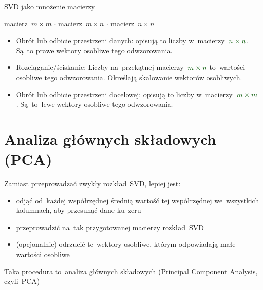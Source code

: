 \documentclass{beamer}
\begin{document}
  \begin{frame}{SVD jako mnożenie macierzy}

    {\g macierz~$m \times m$
    $\cdot$ macierz~$m \times n$
      $\cdot$ macierz~$n \times n$}

    \begin{itemize}
      \item Obrót lub odbicie przestrzeni danych: opisują to liczby
        w~macierzy~$\g n \times n$. Są~to {\g prawe wektory osobliwe}
        tego odwzorowania.
      \item Rozciąganie/ściskanie: Liczby na~przekątnej macierzy~$\g m
        \times n$ to~{\g wartości osobliwe} tego odwzorowania.
        Określają skalowanie wektorów osobliwych.
      \item Obrót lub odbicie przestrzeni docelowej: opisują to liczby
        w~macierzy~$\g m \times m$. Są~to~{\g lewe wektory osobliwe}
        tego odwzorowania.
    \end{itemize}
  \end{frame}

  \section{Analiza głównych składowych (PCA)}

  \begin{frame}
    Zamiast przeprowadzać zwykły rozkład~SVD, lepiej jest:
    \begin{itemize}
      \item odjąć od~każdej współrzędnej średnią wartość tej
        współrzędnej we~wszystkich kolumnach, aby przesunąć dane
        ku~zeru
      \item przeprowadzić na~tak przygotowanej macierzy rozkład~SVD
      \item (opcjonalnie) odrzucić te~wektory osobliwe, którym
        odpowiadają małe wartości osobliwe
    \end{itemize}
    Taka procedura to~{\g analiza głównych składowych} ({\g Principal
      Component Analysis}, czyli~{\g PCA})
  \end{frame}
\end{document}
